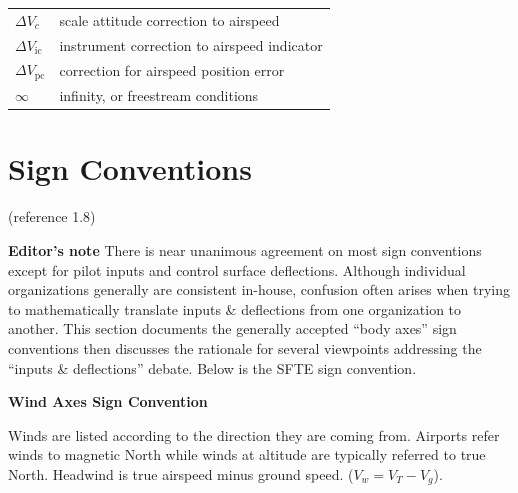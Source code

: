 \documentclass[
]{book}
\begin{document}
\begin{longtable}[]{@{}ll@{}}
\begin{minipage}[t]{0.47\columnwidth}
\(\Delta V_{c}\)\strut
\end{minipage} & \begin{minipage}[t]{0.47\columnwidth}\raggedright
scale attitude correction to airspeed\strut
\end{minipage}\tabularnewline
\begin{minipage}[t]{0.47\columnwidth}\raggedright
\(\Delta V_{\mathrm{ic}}\)\strut
\end{minipage} & \begin{minipage}[t]{0.47\columnwidth}\raggedright
instrument correction to airspeed indicator\strut
\end{minipage}\tabularnewline
\begin{minipage}[t]{0.47\columnwidth}\raggedright
\(\Delta V_{\mathrm{pc}}\)\strut
\end{minipage} & \begin{minipage}[t]{0.47\columnwidth}\raggedright
correction for airspeed position error\strut
\end{minipage}\tabularnewline
\begin{minipage}[t]{0.47\columnwidth}\raggedright
\(\infty\)\strut
\end{minipage} & \begin{minipage}[t]{0.47\columnwidth}\raggedright
infinity, or freestream conditions\strut
\end{minipage}\tabularnewline
\bottomrule
\end{longtable}

\hypertarget{sign-conventions}{%
\section{Sign Conventions}\label{sign-conventions}}

(reference 1.8)

\textbf{Editor's note} There is near unanimous agreement on most sign conventions except for pilot inputs and control surface deflections. Although individual organizations generally are consistent in-house, confusion often arises when trying to mathematically translate inputs \& deflections from one organization to another. This section documents the generally accepted ``body axes'' sign conventions then discusses the rationale for several viewpoints addressing the ``inputs \& deflections'' debate. Below is the SFTE sign convention.

\textbf{Wind Axes Sign Convention}

Winds are listed according to the direction they are coming from. Airports refer winds to magnetic North while winds at altitude are typically referred to true North. Headwind is true airspeed minus ground speed. (\(V_w =V_T - V_g\)).
\end{document}
